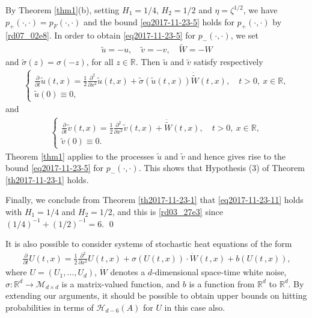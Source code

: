 \documentclass[12pt,a4paper]{article}
\newcommand{\R}{{\mathbb{R}}}
\newcommand{\MM}{\mathcal{M}}
\newcommand {\deltah}{{\zeta}}
\newcommand{\<}{\langle}
\renewcommand{\>}{\rangle}
\begin{document}
 By Theorem \ref{thm1}(b), setting $H_1 = 1/4$, $H_2 = 1/2$ and $\eta = \deltah^{1/2}$, we have $p_+(\cdot, \cdot) = p_F(\cdot, \cdot)$ and the bound \eqref{eq2017-11-23-5} holds for $p_+(\cdot, \cdot)$ by \eqref{rd07_02e8}. 
 In order to obtain \eqref{eq2017-11-23-5} for $p_-(\cdot, \cdot)$, we set 
 \begin{align*}
 \tilde{u}=-u,\quad  \tilde{v}=-v, \quad  \tilde{W}=-W
 \end{align*}
 and $\tilde{\sigma}(z)=\sigma(-z)$, for all $z\in \R$. Then $\tilde{u}$ and $\tilde{v}$ satisfy respectively 
 \begin{align*}
\begin{cases}
\frac{\partial}{\partial t} \tilde{u}(t,x) =\frac{1}{2} \frac{\partial^2}{\partial x^2} \tilde{u}(t,x) +\tilde{\sigma}(\tilde{u}(t\,,x)) \dot{\tilde{W}}(t\,,x),\quad  t>0,\ x\in \R,\\
\tilde{u}(0)\equiv 0,
\end{cases}
\end{align*}
and 
\begin{align*}
\begin{cases}
\frac{\partial}{\partial t}  \tilde{v}(t,x) =\frac{1}{2} \frac{\partial^2}{\partial x^2}  \tilde{v}(t,x) + \dot{\tilde{W}}(t\,,x),\quad  t>0,\ x\in \R,\\
\tilde{v}(0)\equiv 0.
\end{cases}
\end{align*}
Theorem \ref{thm1}  applies to the processes $\tilde{u}$ and $\tilde{v}$ and hence gives rise to the bound \eqref{eq2017-11-23-5} for  $p_-(\cdot, \cdot)$. This shows that Hypothesis (3) of Theorem \ref{th2017-11-23-1} holds.
 
 
Finally, we conclude from Theorem \ref{th2017-11-23-1} that \eqref{eq2017-11-23-11} holds with $H_1 = 1/4$ and $H_2 = 1/2$, and this is \eqref{rd03_27e3} since $(1/4)^{-1} + (1/2)^{-1} = 6$.
 \qed
 
 
\begin{remark}
It is also possible to consider systems of stochastic heat equations of the form
\begin{align*}
          \frac{\partial}{\partial t} U(t\,,x) =\frac{1}{2} \frac{\partial^2}{\partial x^2} U(t\,,x) + \sigma(U(t\,,x))\cdot \dot{W}(t\,,x) + b(U(t\,,x)),
\end{align*}
where $U=(U_1, \ldots, U_d)$, $\dot{{W}}$ denotes a $d$-dimensional space-time white noise, $\sigma: \R^d \to \MM_{d \times d}$ is a matrix-valued function, and $b$ is a function from $\R^d$ to $\R^d$. By extending our arguments, it should be possible to obtain upper bounds on hitting probabilities in terms of $\mathscr{H}_{d-6}(A)$ for $U$ in this case also. 
 \end{remark}
 
\end{document}
